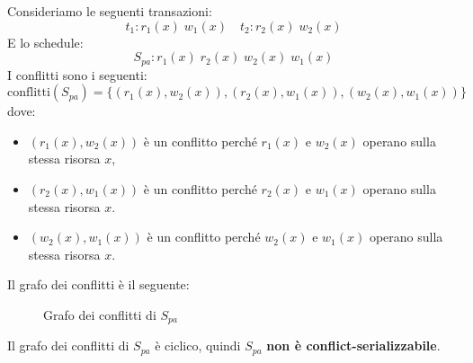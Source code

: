 \documentclass[a4paper]{article}
\begin{document}
\begin{Example}{}{}
Consideriamo le seguenti transazioni:
\[
  t_1 : r_1(x)\; w_1(x) \quad t_2 : r_2(x)\;  w_2(x) 
\]
E lo schedule:  
\[
  S_{pa} : r_1(x) \; r_2(x)\;  w_2(x)\;  w_1(x)
\]
I conflitti sono i seguenti:
\[
  \text{conflitti}(S_{pa}) = \{ (r_1(x), w_2(x)), (r_2(x), w_1(x)), (w_2(x), w_1(x))\}
\]
dove:
\begin{itemize}
  \item $(r_1(x), w_2(x))$ è un conflitto perché $r_1(x)$ e $w_2(x)$ operano sulla stessa risorsa $x$,
  \item $(r_2(x), w_1(x))$ è un conflitto perché $r_2(x)$ e $w_1(x)$ operano sulla stessa risorsa $x$.
  \item $(w_2(x), w_1(x))$ è un conflitto perché $w_2(x)$ e $w_1(x)$ operano sulla stessa risorsa $x$.
\end{itemize}
Il grafo dei conflitti è il seguente:
\begin{figure}[H]
  \centering
  \caption{Grafo dei conflitti di \( S_{pa} \)}
\end{figure}
\noindent
Il grafo dei conflitti di \( S_{pa} \) è ciclico, quindi \( S_{pa} \) \textbf{non è
conflict-serializzabile}.

\end{Example}
\end{document}
